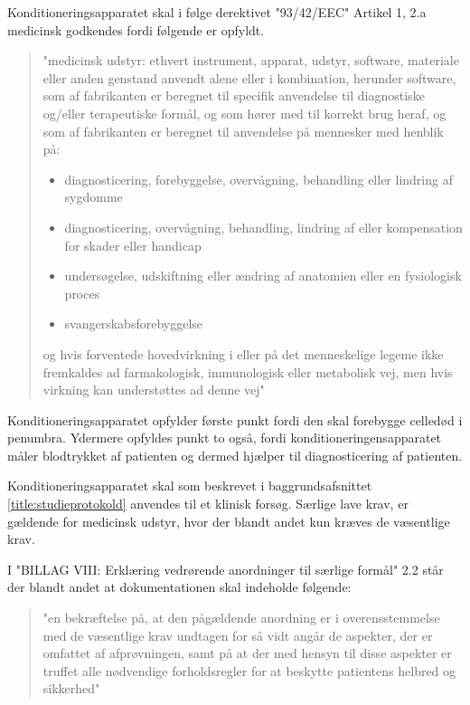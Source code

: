 Konditioneringsapparatet skal i følge derektivet "93/42/EEC" Artikel 1, 2.a medicinsk godkendes fordi følgende er opfyldt.

\begin{quote}
	"medicinsk udstyr: ethvert instrument, apparat, udstyr, software,
	materiale eller anden genstand anvendt alene eller i kombination,
	herunder software, som af fabrikanten er beregnet til specifik anvendelse
	til diagnostiske og/eller terapeutiske formål, og som hører med
	til korrekt brug heraf, og som af fabrikanten er beregnet til anvendelse
	på mennesker med henblik på:
	\begin{itemize}
		\item diagnosticering, forebyggelse, overvågning, behandling eller
		lindring af sygdomme
		\item diagnosticering, overvågning, behandling, lindring af eller
		kompensation for skader eller handicap
		\item undersøgelse, udskiftning eller ændring af anatomien eller en
		fysiologisk proces
		\item svangerskabsforebyggelse
	\end{itemize}
	
	og hvis forventede hovedvirkning i eller på det menneskelige
	legeme ikke fremkaldes ad farmakologisk, immunologisk eller metabolisk
	vej, men hvis virkning kan understøttes ad denne vej" 
\end{quote}

Konditioneringsapparatet opfylder første punkt fordi den skal forebygge celledød i penumbra. Ydermere opfyldes punkt to også, fordi konditioneringensapparatet måler blodtrykket af patienten og dermed hjælper til diagnosticering af patienten.

Konditioneringsapparatet skal som beskrevet i baggrundsafsnittet \ref{title:studieprotokold} anvendes til et klinisk forsøg. Særlige lave krav, er gældende for medicinsk udstyr, hvor der blandt andet kun kræves de væsentlige krav.

I "BILLAG VIII: Erklæring vedrørende anordninger til særlige formål" 2.2 står der blandt andet at dokumentationen skal indeholde følgende:

\begin{quote}
	"en bekræftelse på, at den pågældende anordning er i overensstemmelse
	med de væsentlige krav undtagen for så vidt angår de aspekter, der er
	omfattet af afprøvningen, samt på at der med hensyn til disse aspekter
	er truffet alle nødvendige forholdsregler for at beskytte patientens
	helbred og sikkerhed"
\end{quote}

